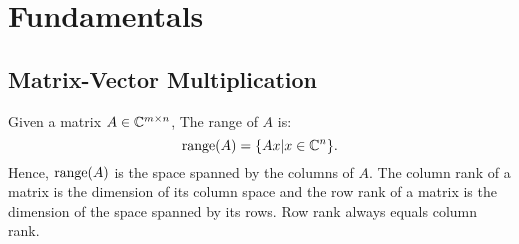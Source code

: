 \part{Fundamentals}
\chapter{Matrix-Vector Multiplication}

Given a matrix $A\in \mathbb{C}^{m\times n}$, The range of $A$ is: 
\[
    \operatorname{range}(A) = \{Ax| x\in \mathbb{C}^n\}.  
\]
Hence, $\operatorname{range}(A)$ is the space spanned by the columns of $A$.  The column rank of a matrix is the dimension of its column space and the row rank of a matrix is the dimension of the space spanned by its rows. Row rank always equals column rank. 